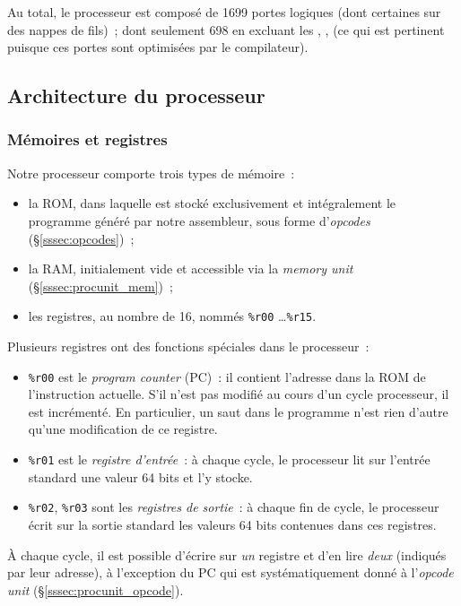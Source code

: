 \documentclass[11pt,a4paper]{article}
\newcommand{\relire}{}
\newcommand{\relu}[1]{}
\begin{document}
Au total, le processeur est composé de 1699 portes logiques (dont certaines sur des nappes de fils)~; dont seulement 698 en excluant les , ,  (ce qui est pertinent puisque ces portes sont optimisées par le compilateur).

\subsection{Architecture du processeur}

\subsubsection{Mémoires et registres} \label{sssec:memory}
\relire
\relu{Théo}

\noindent Notre processeur comporte trois types de mémoire~:
\begin{itemize}
\item la ROM, dans laquelle est stocké exclusivement et intégralement le programme généré par notre assembleur, sous forme d'\textit{opcodes} (§\ref{sssec:opcodes})~;

\item la RAM, initialement vide et accessible via la \textit{memory unit} (§\ref{sssec:procunit_mem})~;
\item les registres, au nombre de 16, nommés \texttt{\%r00} \ldots \texttt{\%r15}.
\end{itemize}

\noindent Plusieurs registres ont des fonctions spéciales dans le processeur~:
\begin{itemize}
\item \texttt{\%r00} est le \emph{program counter} (PC)~: il contient l'adresse dans la ROM de l'instruction actuelle. S'il n'est pas modifié au cours d'un cycle processeur, il est incrémenté. En particulier, un saut dans le programme n'est rien d'autre qu'une modification de ce registre.
\item \texttt{\%r01} est le \emph{registre d'entrée}~: à chaque cycle, le processeur lit sur l'entrée standard une valeur 64 bits et l'y stocke.
\item \texttt{\%r02}, \texttt{\%r03} sont les \emph{registres de sortie}~: à chaque fin de cycle, le processeur écrit sur la sortie standard les valeurs 64 bits contenues dans ces registres.
\end{itemize}

À chaque cycle, il est possible d'écrire sur \emph{un} registre et d'en lire \emph{deux} (indiqués par leur adresse), à l'exception du PC qui est systématiquement donné à l'\textit{opcode unit} (§\ref{sssec:procunit_opcode}).
\end{document}
